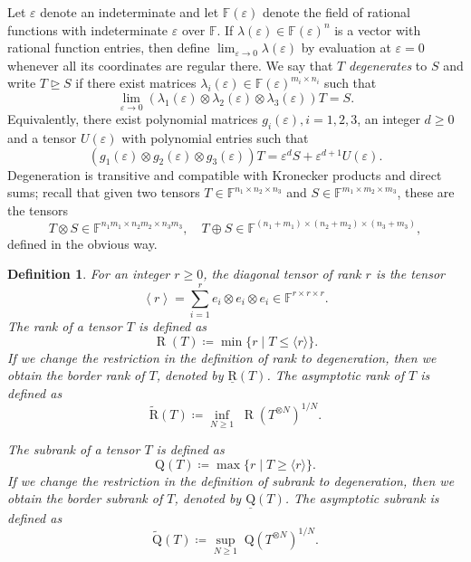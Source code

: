 \documentclass[11pt,letterpaper]{article}
\newtheorem{definition}[theorem]{Definition}\AddToHook{env/definition/begin}{\crefalias{theorem}{definition}}
\numberwithin{equation}{section}
\newcommand{\brk}{\underline{\mathrm{R}}}
\newcommand{\ark}{\widetilde{\mathrm{R}}}
\newcommand{\FF}{\mathbb{F}}
\DeclareMathOperator{\Rk}{\mathrm{R}}
\begin{document}
Let $\varepsilon$ denote an indeterminate and let $\FF(\varepsilon)$ denote the field of rational functions with indeterminate $\varepsilon$ over $\FF$.
If $\lambda(\varepsilon)\in\FF(\varepsilon)^n$ is a vector with rational function entries,
then define $\lim_{\varepsilon\rightarrow 0}\lambda(\varepsilon)$ by evaluation at $\varepsilon=0$ whenever all its coordinates are regular there.
We say that $T$ \emph{degenerates} to $S$ and write $T\trianglerighteq S$ if there exist matrices $\lambda_i(\varepsilon)\in\FF(\varepsilon)^{m_i\times n_i}$ such that \[
\lim_{\varepsilon\rightarrow 0} (\lambda_1(\varepsilon)\otimes \lambda_2(\varepsilon)\otimes \lambda_3(\varepsilon)) T = S.
\] Equivalently,
there exist polynomial matrices $g_i(\varepsilon), i=1,2,3$, an integer $d\geq 0$ and a tensor $U(\varepsilon)$ with polynomial entries such that
\begin{equation}
\label{eq:degen-def}
\left(g_1(\varepsilon)\otimes g_2(\varepsilon)\otimes g_3(\varepsilon)\right)  T = \varepsilon^d S + \varepsilon^{d+1} U(\varepsilon).
\end{equation}
Degeneration is transitive and compatible with Kronecker products and direct sums;
recall that given two tensors $T\in\FF^{n_1\times n_2\times n_3}$ and $S\in \FF^{m_1\times m_2\times m_3}$, these are the tensors
\[
T\otimes S \in \FF^{n_1m_1\times n_2m_2\times n_3m_3},
\quad
T\oplus S \in \FF^{(n_1+m_1)\times (n_2+m_2)\times (n_3+m_3)},
\] defined in the obvious way.

\begin{definition}\label{def:rank-invariants}
  For an integer $r \geq 0$, the \emph{diagonal tensor of rank $r$} is the tensor
  \[ \left<r\right> = \sum_{i = 1}^{r} e_i \otimes e_i \otimes e_i \in \FF^{r \times r \times r}. \]
The \emph{rank} of a tensor $T$ is defined as \[
\Rk(T) \coloneqq \min\{r \mid T\leq \langle r\rangle\}.
\]
If we change the restriction in the definition of rank to degeneration, then we obtain the \emph{border rank} of $T$, denoted by $\brk(T)$.
The \emph{asymptotic rank} of $T$ is defined as \[
\ark(T) \coloneqq \inf_{N\geq 1} \;\Rk(T^{\otimes N})^{1/N}.
\]

The \emph{subrank} of a tensor $T$ is defined as \[
\mathrm{Q}(T) \coloneqq \max\{r\mid T\geq \langle r\rangle\}.
\] If we change the restriction in the definition of subrank to degeneration, then we obtain the \emph{border subrank} of $T$, denoted by $\underline{\mathrm{Q}}(T)$.
The \emph{asymptotic subrank} is defined as \[
\widetilde{\mathrm{Q}}(T)\coloneqq \sup_{N\geq 1}\; \mathrm{Q}(T^{\otimes N})^{1/N}.
\]
\end{definition}
\end{document}
